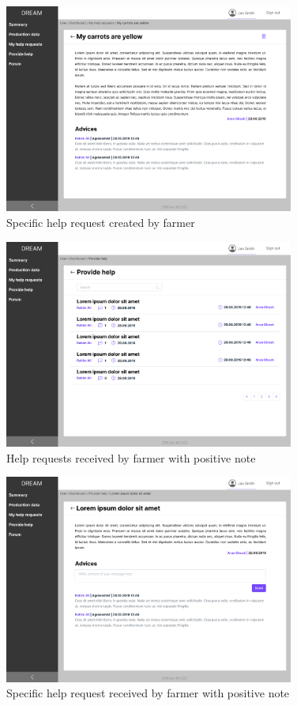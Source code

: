\begin{figure}[H]
\centering
\includegraphics[width=0.85\textwidth]{mockups/Farmer_Dashboard_My help requests_VIew request.png}
\caption{Specific help request created by farmer}
\end{figure}

\begin{figure}[H]
\centering
\includegraphics[width=0.85\textwidth]{mockups/Farmer_Dashboard_Provide help.png}
\caption{Help requests received by farmer with positive note}
\end{figure}

\begin{figure}[H]
\centering
\includegraphics[width=0.85\textwidth]{mockups/Farmer_Dashboard_Provide help_Request.png}
\caption{Specific help request received by farmer with positive note}
\end{figure}

